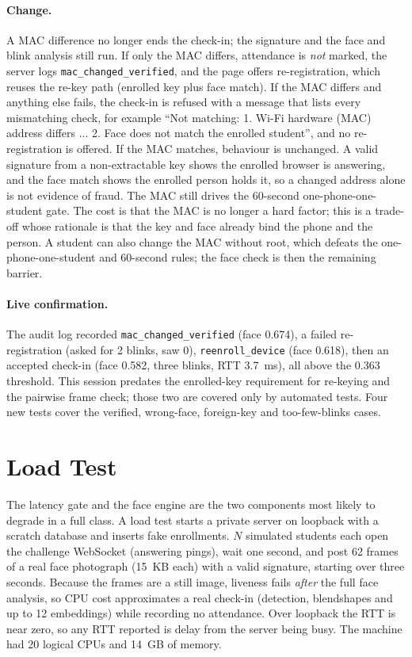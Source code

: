 \documentclass[11pt,a4paper]{article}
\newcommand{\code}[1]{\texttt{#1}}
\begin{document}
\paragraph{Change.} A MAC difference no longer ends the check-in; the signature and the face and blink analysis still run. If only the MAC differs, attendance is \emph{not} marked, the server logs \code{mac\_changed\_verified}, and the page offers re-registration, which reuses the re-key path (enrolled key plus face match). If the MAC differs and anything else fails, the check-in is refused with a message that lists every mismatching check, for example ``Not matching: 1. Wi-Fi hardware (MAC) address differs ... 2. Face does not match the enrolled student'', and no re-registration is offered. If the MAC matches, behaviour is unchanged. A valid signature from a non-extractable key shows the enrolled browser is answering, and the face match shows the enrolled person holds it, so a changed address alone is not evidence of fraud. The MAC still drives the 60-second one-phone-one-student gate. The cost is that the MAC is no longer a hard factor; this is a trade-off whose rationale is that the key and face already bind the phone and the person. A student can also change the MAC without root, which defeats the one-phone-one-student and 60-second rules; the face check is then the remaining barrier.

\paragraph{Live confirmation.} The audit log recorded \code{mac\_changed\_verified} (face 0.674), a failed re-registration (asked for 2 blinks, saw 0), \code{reenroll\_device} (face 0.618), then an accepted check-in (face 0.582, three blinks, RTT 3.7~ms), all above the 0.363 threshold. This session predates the enrolled-key requirement for re-keying and the pairwise frame check; those two are covered only by automated tests. Four new tests cover the verified, wrong-face, foreign-key and too-few-blinks cases.

\section{Load Test}\label{sec:load}
The latency gate and the face engine are the two components most likely to degrade in a full class. A load test starts a private server on loopback with a scratch database and inserts fake enrollments. $N$ simulated students each open the challenge WebSocket (answering pings), wait one second, and post 62 frames of a real face photograph (15~KB each) with a valid signature, starting over three seconds. Because the frames are a still image, liveness fails \emph{after} the full face analysis, so CPU cost approximates a real check-in (detection, blendshapes and up to 12 embeddings) while recording no attendance. Over loopback the RTT is near zero, so any RTT reported is delay from the server being busy. The machine had 20 logical CPUs and 14~GB of memory.
\end{document}
